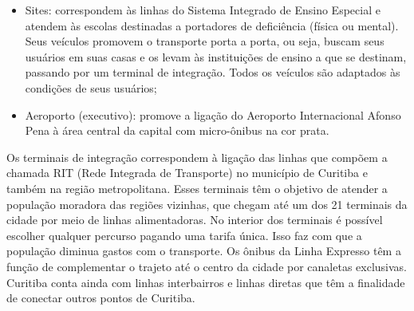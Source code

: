 {\begin{itemize}
  \item Sites: correspondem às linhas do Sistema Integrado de Ensino Especial e atendem às escolas destinadas a portadores de deficiência (física ou mental). Seus veículos promovem o transporte porta a porta, ou seja, buscam seus usuários em suas casas e os levam às instituições de ensino a que se destinam, passando por um terminal de integração. Todos os veículos são adaptados às condições de seus usuários;
  \item Aeroporto (executivo): promove a ligação do Aeroporto Internacional Afonso Pena à área central da capital com micro-ônibus na cor prata. 
\end{itemize}
}

\textcolor{clauciane}{
Os terminais de integração correspondem à ligação das linhas que compõem a chamada RIT (Rede Integrada de Transporte) no município de Curitiba e também na região metropolitana. Esses terminais têm o objetivo de atender a população moradora das regiões vizinhas, que chegam até um dos 21 terminais da cidade por meio de linhas alimentadoras. No interior dos terminais é possível escolher qualquer percurso pagando uma tarifa única. Isso faz com que a população diminua gastos com o transporte. Os ônibus da Linha Expresso têm a função de complementar o trajeto até o centro da cidade por canaletas exclusivas. Curitiba conta ainda com linhas interbairros e linhas diretas que têm a finalidade de conectar outros pontos de Curitiba.
}


